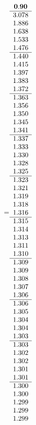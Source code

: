 =\hbox{$\begin{array}{c}
\bf 0.90 
 \\ \hline 
   3.078 \\ 
   1.886 \\ 
   1.638 \\ 
   1.533 \\ 
   1.476
 \\ \hline 
   1.440 \\ 
   1.415 \\ 
   1.397 \\ 
   1.383 \\ 
   1.372
 \\ \hline 
   1.363 \\ 
   1.356 \\ 
   1.350 \\ 
   1.345 \\ 
   1.341
 \\ \hline 
   1.337 \\ 
   1.333 \\ 
   1.330 \\ 
   1.328 \\ 
   1.325
 \\ \hline 
   1.323 \\ 
   1.321 \\ 
   1.319 \\ 
   1.318 \\ 
   1.316
 \\ \hline 
   1.315 \\ 
   1.314 \\ 
   1.313 \\ 
   1.311 \\ 
   1.310
 \\ \hline 
   1.309 \\ 
   1.309 \\ 
   1.308 \\ 
   1.307 \\ 
   1.306
 \\ \hline 
   1.306 \\ 
   1.305 \\ 
   1.304 \\ 
   1.304 \\ 
   1.303
 \\ \hline 
   1.303 \\ 
   1.302 \\ 
   1.302 \\ 
   1.301 \\ 
   1.301
 \\ \hline 
   1.300 \\ 
   1.300 \\ 
   1.299 \\ 
   1.299 \\ 
   1.299
 \end{array}$}
